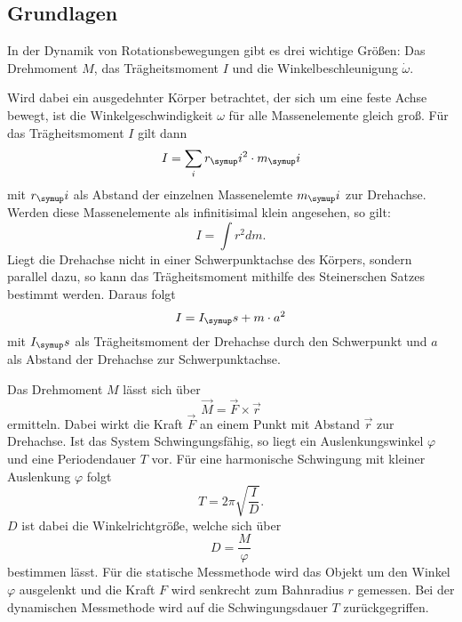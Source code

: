 \subsection{Grundlagen}
In der Dynamik von Rotationsbewegungen gibt es drei wichtige Größen:
Das Drehmoment $M$, das Trägheitsmoment $I$ und die Winkelbeschleunigung $\dot
\omega$.

Wird dabei ein ausgedehnter Körper betrachtet, der sich um eine feste Achse bewegt,
ist die Winkelgeschwindigkeit $\omega$ für alle Massenelemente gleich groß.
Für das Trägheitsmoment $I$ gilt dann
\begin{equation}
  I = \sum_i r_\su{i}^2 \cdot m_\su{i}
\end{equation}
mit $r_\su{i}$ als Abstand der einzelnen Massenelemte $m_\su{i}$ zur Drehachse.
Werden diese Massenelemente als infinitisimal klein angesehen, so gilt:
\begin{equation}
  I = \int r^2dm.
\end{equation}
Liegt die Drehachse nicht in einer Schwerpunktachse des Körpers, sondern parallel dazu,
so kann das Trägheitsmoment mithilfe des Steinerschen Satzes bestimmt werden.
Daraus folgt
\begin{equation}
  I = I_\su{s} + m \cdot a^2
\end{equation}
mit $I_\su{s}$ als Trägheitsmoment der Drehachse durch den Schwerpunkt und $a$ als
Abstand der Drehachse zur Schwerpunktachse.

Das Drehmoment $M$ lässt sich über
\begin{equation}
  \vec{M} = \vec{F} \times \vec{r} \label{eqn:M}
\end{equation}
ermitteln. Dabei wirkt die Kraft $\vec{F}$ an einem Punkt mit Abstand $\vec{r}$
zur Drehachse.
Ist das System Schwingungsfähig, so liegt ein Auslenkungswinkel $\varphi$ und eine
Periodendauer $T$ vor. Für eine harmonische Schwingung mit kleiner Auslenkung $\varphi$
folgt
\begin{equation}
  T = 2\pi\sqrt{\frac{I}{D}}.
\end{equation}
$D$ ist dabei die Winkelrichtgröße, welche sich über
\begin{equation}
  D = \frac{M}{\varphi}
\end{equation}
bestimmen lässt.
Für die statische Messmethode wird das Objekt um den Winkel $\varphi$ ausgelenkt
und die Kraft $F$ wird senkrecht zum Bahnradius $r$ gemessen.
Bei der dynamischen Messmethode wird auf die Schwingungsdauer $T$ zurückgegriffen.
